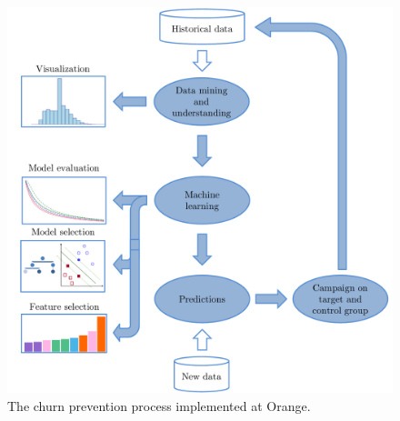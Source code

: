 \begin{figure}[ht]
    \centering
    \includegraphics[width=0.8\linewidth]{figures/churn_diagram}
    \caption{The churn prevention process implemented at Orange.}
    \label{churn_diagram}
\end{figure}

